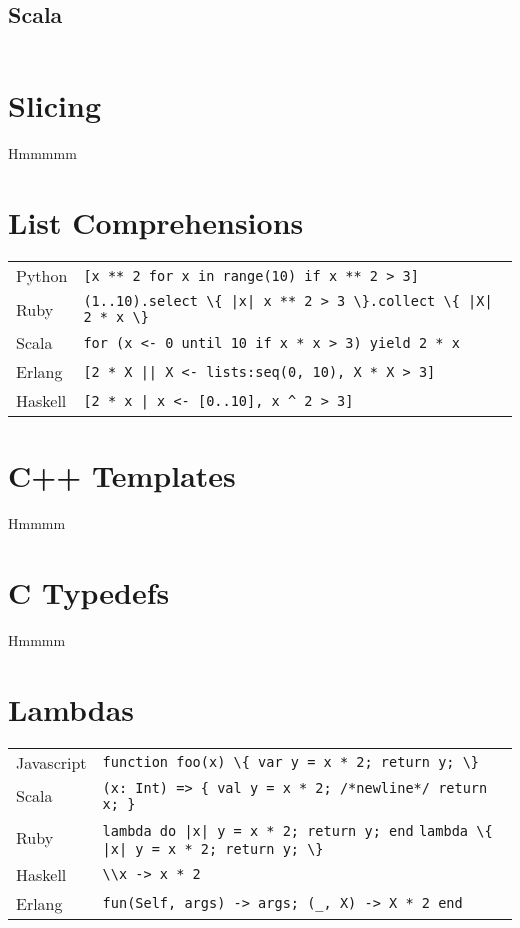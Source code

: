 \documentclass{article}
\begin{document}
\subsection{Scala}
\begin{lstlisting}

\end{lstlisting}

\section{Slicing}
Hmmmmm

\section{List Comprehensions}
\begin{longtabu} to 0.75\linewidth { X X }
	Python & \lstinline$[x ** 2 for x in range(10) if x ** 2 > 3]$ \\
	Ruby & \lstinline$(1..10).select \{ |x| x ** 2 > 3 \}.collect \{ |X| 2 * x \}$ \\
	Scala & \lstinline$for (x <- 0 until 10 if x * x > 3) yield 2 * x$ \\
	Erlang & \lstinline$[2 * X || X <- lists:seq(0, 10), X * X > 3]$ \\
	Haskell & \lstinline$[2 * x | x <- [0..10], x ^ 2 > 3]$ \\
\end{longtabu}

\section{C++ Templates}
Hmmmm

\section{C Typedefs}
Hmmmm

\section{Lambdas}
\begin{longtabu} to 0.75\linewidth { X X }
	Javascript & \lstinline$function foo(x) \{ var y = x * 2; return y; \}$ \\
	Scala & \lstinline$(x: Int) => { val y = x * 2; /*newline*/ return x; }$ \\
	Ruby & \lstinline$lambda do |x| y = x * 2; return y; end$ \newline \lstinline$lambda \{ |x| y = x * 2; return y; \}$ \\
	Haskell & \lstinline$\\x -> x * 2$ \\
	Erlang & \lstinline$fun(Self, args) -> args; (_, X) -> X * 2 end$
\end{longtabu}
\end{document}
